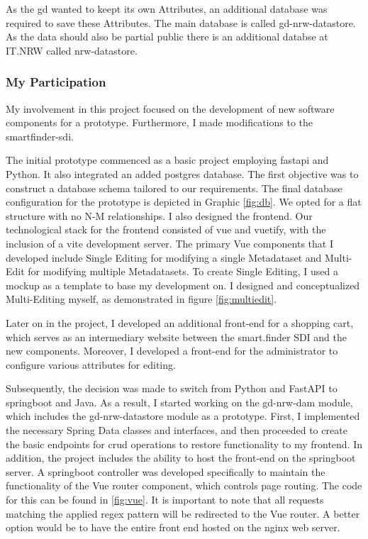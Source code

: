 \documentclass[11pt, titlepage, a4paper]{article}
\begin{document}

As the \gls{gd}  wanted to keept its own Attributes, an additional database was required to save these Attributes. The main database is called gd-nrw-datastore. As the data should also be partial public there is an additional databse at IT.NRW called nrw-datastore. %



\subsubsection{My Participation}
My involvement in this project focused on the development of new software components for a prototype. Furthermore, I made modifications to the smartfinder-sdi.



The initial prototype commenced as a basic project employing \Gls{fastapi} and Python. It also integrated an added \Gls{postgres} database. The first objective was to construct a database schema tailored to our requirements. The final database configuration for the prototype is depicted in Graphic \ref{fig:db}. We opted for a flat structure with no N-M relationships.
I also designed the frontend. Our technological stack for the frontend consisted of \Gls{vue} and \Gls{vuetify}, with the inclusion of a \Gls{vite} development server. The primary Vue components that I developed include Single Editing for modifying a single Metadataset and Multi-Edit for modifying multiple Metadatasets. To create Single Editing, I used a mockup as a template to base my development on. I designed and conceptualized Multi-Editing myself, as demonstrated in figure \ref{fig:multiedit}.

Later on in the project, I developed an additional front-end for a shopping cart, which serves as an intermediary website between the smart.finder SDI and the new components. Moreover, I developed a front-end for the administrator to configure various attributes for editing.




Subsequently, the decision was made to switch from Python and FastAPI to \Gls{springboot} and Java. As a result, I started working on the gd-nrw-dam module, which includes the gd-nrw-datastore module as a prototype. First, I implemented the necessary Spring Data classes and interfaces, and then proceeded to create the basic endpoints for \gls{crud} operations to restore functionality to my frontend. In addition, the project includes the ability to host the front-end on the \Gls{springboot} server. A \Gls{springboot} controller was developed specifically to maintain the functionality of the Vue router component, which controls page routing. The code for this can be found in
\ref{fig:vue}. It is important to note that all requests matching the applied regex pattern will be redirected to the Vue router. A better option would be to have the entire front end hosted on the \Gls{nginx} web server.
\end{document}
